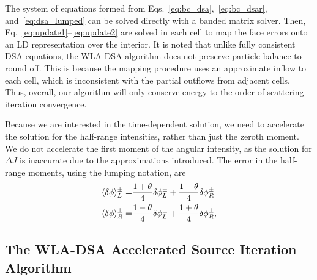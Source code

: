 The system of equations formed from Eqs.~\eqref{eq:bc_dsa},~\eqref{eq:bc_dsar},
and~\eqref{eq:dsa_lumped} can be solved directly with a banded matrix solver. Then,
Eq.~\eqref{eq:update1}--\eqref{eq:update2} are solved in each cell to map the face errors onto
an LD representation over the interior.   It is noted that unlike fully consistent DSA equations, the WLA-DSA algorithm does not
preserve particle balance to round off.  This is because the mapping procedure uses an
approximate inflow to each cell, which is inconsistent with the partial outflows from
adjacent cells.  Thus, overall, our algorithm will only conserve energy to the order of
scattering iteration convergence.

Because we are interested in the time-dependent solution, we need to accelerate the solution for the
half-range intensities, rather than just the zeroth moment. We do not accelerate the first
moment of the angular intensity, as the solution for $\Delta J$ is inaccurate due to the
approximations introduced.  The error in the half-range moments, using
the lumping notation, are 
\begin{align}
    \langle \delta \phi \rangle^{\pm}_L =&  \frac{1+\theta}{4}\delta \phi^{\pm}_{L} +
    \frac{1-\theta}{4}\delta \phi^{\pm}_{R}  \\
    \langle \delta \phi \rangle^{\pm}_R =&  \frac{1-\theta}{4}\delta \phi^{\pm}_{L} +
    \frac{1+\theta}{4}\delta \phi^{\pm}_{R}      ,
\end{align}

\subsection{The WLA-DSA Accelerated Source Iteration Algorithm}

